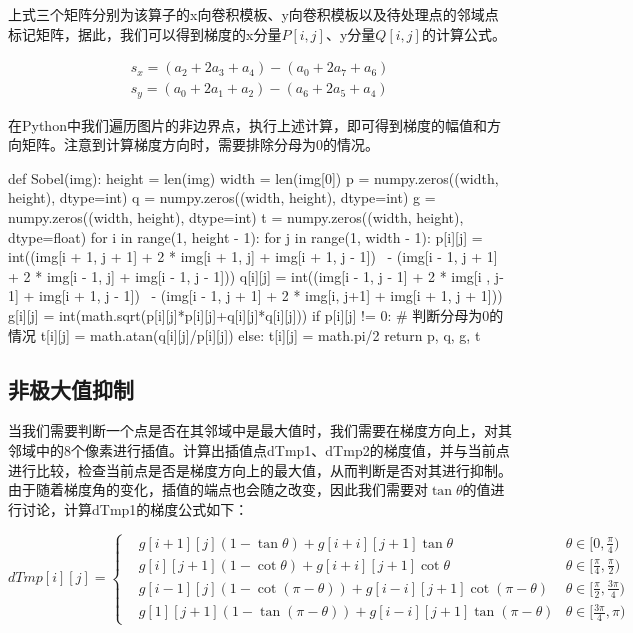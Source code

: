 \documentclass{article}
\begin{document}
上式三个矩阵分别为该算子的x向卷积模板、y向卷积模板以及待处理点的邻域点标记矩阵，据此，我们可以得到梯度的x分量$P[i,j]$、y分量$Q[i,j]$的计算公式。

\begin{equation}
\begin{array}{l}{s_{x}=\left(a_{2}+2 a_{3}+a_{4}\right)-\left(a_{0}+2 a_{7}+a_{6}\right)} \\ {s_{y}=\left(a_{0}+2 a_{1}+a_{2}\right)-\left(a_{6}+2 a_{5}+a_{4}\right)}\end{array}
\end{equation}

在Python中我们遍历图片的非边界点，执行上述计算，即可得到梯度的幅值和方向矩阵。注意到计算梯度方向时，需要排除分母为0的情况。
\begin{python}
def Sobel(img):
    height = len(img)
    width = len(img[0])
    p = numpy.zeros((width, height), dtype=int)
    q = numpy.zeros((width, height), dtype=int)
    g = numpy.zeros((width, height), dtype=int)
    t = numpy.zeros((width, height), dtype=float)
    for i in range(1, height - 1):
        for j in range(1, width - 1):
            p[i][j] = int((img[i + 1, j + 1] + 2 * img[i + 1, j] + img[i + 1, j - 1]) \
                      - (img[i - 1, j + 1] + 2 * img[i - 1, j] + img[i - 1, j - 1]))
            q[i][j] = int((img[i - 1, j - 1] + 2 * img[i , j-1] + img[i + 1, j - 1]) \
                      - (img[i - 1, j + 1] + 2 * img[i, j+1] + img[i + 1, j + 1]))
            g[i][j] = int(math.sqrt(p[i][j]*p[i][j]+q[i][j]*q[i][j]))
            if p[i][j] != 0:     # 判断分母为0的情况
                t[i][j] = math.atan(q[i][j]/p[i][j])
            else:
                t[i][j] = math.pi/2
    return p, q, g, t
\end{python}

\subsection{非极大值抑制}
当我们需要判断一个点是否在其邻域中是最大值时，我们需要在梯度方向上，对其邻域中的8个像素进行插值。计算出插值点dTmp1、dTmp2的梯度值，并与当前点进行比较，检查当前点是否是梯度方向上的最大值，从而判断是否对其进行抑制。由于随着梯度角的变化，插值的端点也会随之改变，因此我们需要对$\tan\theta$的值进行讨论，计算dTmp1的梯度公式如下：

\begin{equation}
dTmp[i][j]=\left\{
\begin{array}{rcl}
& g[i+1][j] (1-\tan\theta) + g[i+i][j+1]\tan \theta  & \theta \in [0,\frac{\pi}{4}) \\
& g[i][j+1] (1-\cot\theta) + g[i+i][j+1]\cot \theta  & \theta \in [\frac{\pi}{4},\frac{\pi}{2}) \\
& g[i-1][j] (1-\cot(\pi-\theta)) + g[i-i][j+1]\cot(\pi-\theta)  &  \theta \in [\frac{\pi}{2},\frac{3\pi}{4}) \\
& g[1][j+1] (1-\tan(\pi-\theta)) + g[i-i][j+1]\tan(\pi-\theta) &  \theta \in [\frac{3\pi}{4},\pi) 
\end{array} \right.
\end{equation}
\end{document}
